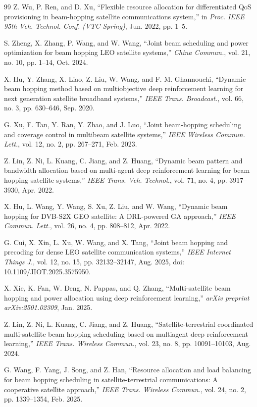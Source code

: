 \documentclass[journal]{IEEEtran}
\begin{document}
\begin{thebibliography}{99}
 Z. Wu, P. Ren, and D. Xu, ``Flexible resource allocation for differentiated QoS provisioning in beam-hopping satellite communications system,'' in \textit{Proc. IEEE 95th Veh. Technol. Conf. (VTC-Spring)}, Jun. 2022, pp. 1--5.

 S. Zheng, X. Zhang, P. Wang, and W. Wang, ``Joint beam scheduling and power optimization for beam hopping LEO satellite systems,'' \textit{China Commun.}, vol. 21, no. 10, pp. 1--14, Oct. 2024.

 X. Hu, Y. Zhang, X. Liao, Z. Liu, W. Wang, and F. M. Ghannouchi, ``Dynamic beam hopping method based on multiobjective deep reinforcement learning for next generation satellite broadband systems,'' \textit{IEEE Trans. Broadcast.}, vol. 66, no. 3, pp. 630--646, Sep. 2020.

 G. Xu, F. Tan, Y. Ran, Y. Zhao, and J. Luo, ``Joint beam-hopping scheduling and coverage control in multibeam satellite systems,'' \textit{IEEE Wireless Commun. Lett.}, vol. 12, no. 2, pp. 267--271, Feb. 2023.

 Z. Lin, Z. Ni, L. Kuang, C. Jiang, and Z. Huang, ``Dynamic beam pattern and bandwidth allocation based on multi-agent deep reinforcement learning for beam hopping satellite systems,'' \textit{IEEE Trans. Veh. Technol.}, vol. 71, no. 4, pp. 3917--3930, Apr. 2022.

 X. Hu, L. Wang, Y. Wang, S. Xu, Z. Liu, and W. Wang, ``Dynamic beam hopping for DVB-S2X GEO satellite: A DRL-powered GA approach,'' \textit{IEEE Commun. Lett.}, vol. 26, no. 4, pp. 808--812, Apr. 2022.

 G. Cui, X. Xin, L. Xu, W. Wang, and X. Tang, ``Joint beam hopping and precoding for dense LEO satellite communication systems,'' \textit{IEEE Internet Things J.}, vol. 12, no. 15, pp. 32132--32147, Aug. 2025, doi: 10.1109/JIOT.2025.3575950.

 X. Xie, K. Fan, W. Deng, N. Pappas, and Q. Zhang, ``Multi-satellite beam hopping and power allocation using deep reinforcement learning,'' \textit{arXiv preprint arXiv:2501.02309}, Jan. 2025.

 Z. Lin, Z. Ni, L. Kuang, C. Jiang, and Z. Huang, ``Satellite-terrestrial coordinated multi-satellite beam hopping scheduling based on multiagent deep reinforcement learning,'' \textit{IEEE Trans. Wireless Commun.}, vol. 23, no. 8, pp. 10091--10103, Aug. 2024.

 G. Wang, F. Yang, J. Song, and Z. Han, ``Resource allocation and load balancing for beam hopping scheduling in satellite-terrestrial communications: A cooperative satellite approach,'' \textit{IEEE Trans. Wireless Commun.}, vol. 24, no. 2, pp. 1339--1354, Feb. 2025.


\end{thebibliography}
\end{document}
